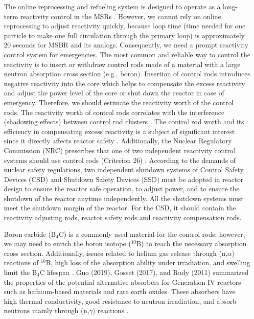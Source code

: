 The online reprocessing and refueling system is designed to operate as a long-term reactivity control in the MSRs \cite{ashraf2019modeling,ashraf2019Preliminary}. However, we cannot rely on online reprocessing to adjust reactivity quickly, because loop time (time needed for one particle to make one full circulation through the primary loop) is approximately 20 seconds for MSBR and its analogs. Consequently, we need a prompt reactivity control system for emergencies. The most common and reliable way to control the reactivity is to insert or withdraw control rods made of a material with a large neutron absorption cross section (e.g., boron).
Insertion of control rods introduces negative reactivity into the 
core which helps to compensate the excess reactivity and 
adjust the power level of the core or shut down the reactor in case of 
emergency. Therefore, we should estimate 
the reactivity worth of the control rods.
The reactivity worth of control rods correlates with the interference 
(shadowing effects) between control rod clusters 
\cite{vcerba2017optimization}. 
The control rod worth and its efficiency in compensating excess reactivity is a subject of significant interest since it directly affects reactor safety \cite{atkinson2019small}. Additionally, the Nuclear Regulatory Commission (NRC) prescribes that one of two independent reactivity control systems should use control rods (Criterion 26) \cite{nuclear1987standard}. According to the demands of nuclear safety regulations, two independent shutdown systems of Control Safety Devices (CSD) and Shutdown Safety Devices (SSD) must be adopted in reactor design to ensure the reactor safe operation, to adjust power, and to ensure the shutdown of the reactor anytime independently. All the shutdown systems must meet the shutdown margin of the reactor. For the CSD, it should contain the reactivity adjusting rods, reactor safety rods and reactivity compensation rods.

Boron carbide (B$_4$C) is a commonly used material for the control rods; 
however, we may need to enrich the boron isotope ($^{10}$B) to reach 
the necessary absorption cross section. Additionally, issues related to helium gas release through (n,$\alpha$) reactions of $^{10}$B, high loss of the absorption ability under irradiation, and swelling limit the B$_4$C lifespan 
\cite{guo2019optimized}. Guo (2019), Gosset (2017), and Rudy (2011) summarized the properties of the 
potential alternative absorbers for Generation-IV reactors such as 
hafnium-based materials and rare earth oxides. These absorbers have 
high thermal conductivity, good resistance to neutron irradiation, and
absorb neutrons mainly through (n,$\gamma$) reactions
\cite{guo2019optimized}.

